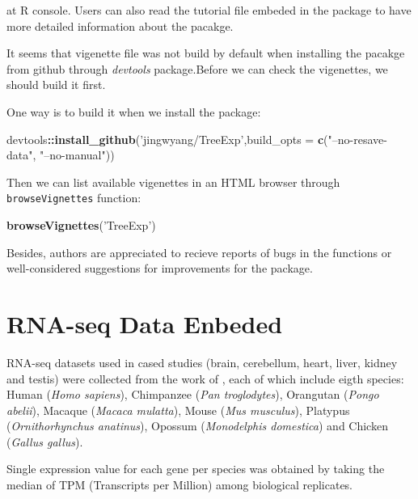 \documentclass[]{book}
\newenvironment{Shaded}{\begin{snugshade}}{\end{snugshade}}
\newcommand{\DataTypeTok}[1]{\textcolor[rgb]{0.13,0.29,0.53}{#1}}
\newcommand{\KeywordTok}[1]{\textcolor[rgb]{0.13,0.29,0.53}{\textbf{#1}}}
\newcommand{\NormalTok}[1]{#1}
\newcommand{\OperatorTok}[1]{\textcolor[rgb]{0.81,0.36,0.00}{\textbf{#1}}}
\newcommand{\StringTok}[1]{\textcolor[rgb]{0.31,0.60,0.02}{#1}}
\begin{document}
at R console. Users can also read the tutorial file embeded in the package to have more detailed information about the pacakge.

It seems that vigenette file was not build by default when installing the pacakge from github through \emph{devtools} package.Before we can check the vigenettes, we should build it first.

One way is to build it when we install the package:

\begin{Shaded}
\begin{Highlighting}[]
\NormalTok{devtools}\OperatorTok{::}\KeywordTok{install_github}\NormalTok{(}\StringTok{'jingwyang/TreeExp'}\NormalTok{,}\DataTypeTok{build_opts =} \KeywordTok{c}\NormalTok{(}\StringTok{"--no-resave-data"}\NormalTok{, }\StringTok{"--no-manual"}\NormalTok{))}
\end{Highlighting}
\end{Shaded}

Then we can list available vigenettes in an HTML browser through \texttt{browseVignettes} function:

\begin{Shaded}
\begin{Highlighting}[]
\KeywordTok{browseVignettes}\NormalTok{(}\StringTok{'TreeExp'}\NormalTok{)}
\end{Highlighting}
\end{Shaded}

Besides, authors are appreciated to recieve reports of bugs in the functions or well-considered suggestions for improvements for the package.

\newpage

\hypertarget{rna-seq-data-enbeded}{%
\section{RNA-seq Data Enbeded}\label{rna-seq-data-enbeded}}

RNA-seq datasets used in cased studies (brain, cerebellum, heart, liver, kidney and testis) were collected from the work of \citep{brawand2011}, each of which include eigth species: Human (\emph{Homo sapiens}), Chimpanzee (\emph{Pan troglodytes}), Orangutan (\emph{Pongo abelii}), Macaque (\emph{Macaca mulatta}), Mouse (\emph{Mus musculus}), Platypus (\emph{Ornithorhynchus anatinus}), Opossum (\emph{Monodelphis domestica}) and Chicken (\emph{Gallus gallus}).

Single expression value for each gene per species was obtained by taking the median of TPM (Transcripts per Million) among biological replicates.
\end{document}
